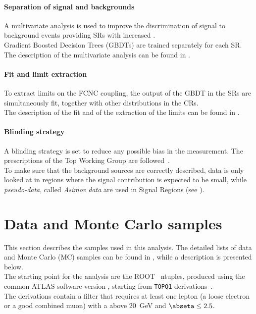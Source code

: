 \paragraph{Separation of signal and backgrounds}
A multivariate analysis is used to improve the discrimination of
signal to background events providing SRs with increased \ssb. \\
Gradient Boosted Decision Trees (GBDTs) are trained separately for each SR. \\
The description of the multivariate analysis can be found in
. 

\paragraph{Fit and limit extraction}
To extract limits on the FCNC \tZc coupling, the output of the
GBDT in the SRs are simultaneously fit, together with other 
distributions in the CRs.\\ 
The description of the fit and of the extraction of the limits can be
found in .

\paragraph{Blinding strategy}
A blinding strategy is set to reduce any possible bias in the measurement. 
The prescriptions of the Top Working Group are followed~\cite{top:blind}.\\
To make sure that the background sources are correctly described,
data is only looked at in regions where the signal contribution is expected to be small, while 
\textit{pseudo-data}, called \textit{Asimov data} are used in Signal Regions (see ). 

\section{Data and Monte Carlo samples}
\label{sec:samples}
This section describes the samples used in this analysis.
The detailed lists of data and Monte Carlo (MC) samples can be found
in \App{\ref{appendix:app_mc}}, 
while a description is presented below.\\
The starting point for the analysis are the ROOT~\cite{Antcheva:2009zz} ntuples, produced using the common ATLAS software version
\anabasevers, starting from \texttt{TOPQ1} derivations~\cite{top:deriv}.\\
The derivations contain a filter that requires at least one lepton
(a loose electron or a good combined muon) with a \pT above \SI{20}{\GeV} and $\abseta \leq 2.5$. 

